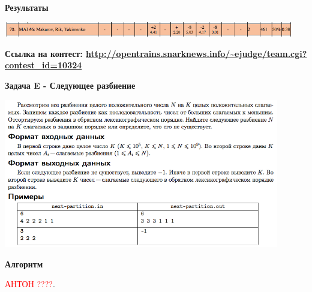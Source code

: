 \documentclass[a4paper,12pt]{article}
\begin{document}
\textbf{{\large Результаты}} \\
\begin{center}
\includegraphics[width=0.95\textwidth]{OC_SPB/result.png}\\ [1cm]
\end{center}

\textbf{{\large Ссылка на контест: \url{http://opentrains.snarknews.info/~ejudge/team.cgi?contest_id=10324}}}

\newpage
\textbf{{\large Задача E - Следующее разбиение}}

\begin{center}
\includegraphics[width=0.9\textwidth]{OC_SPB/E.png}\\ [1cm]
\end{center}

\textbf{{\large Алгоритм}}

\textcolor{red}{\Huge{АНТОН ????}}. \\
\end{document}
